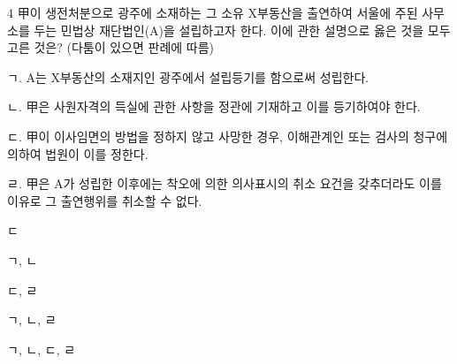 \begin{question}{4}
甲이 생전처분으로 광주에 소재하는 그 소유 X부동산을 출연하여 서울에 주된 사무소를 두는 민법상 재단법인(A)을 설립하고자 한다. 이에 관한 설명으로 옳은 것을 모두 고른 것은? (다툼이 있으면 판례에 따름)
\begin{framedtext}
ㄱ. A는 X부동산의 소재지인 광주에서 설립등기를 함으로써 성립한다. \par
ㄴ. 甲은 사원자격의 득실에 관한 사항을 정관에 기재하고 이를 등기하여야 한다. \par
ㄷ. 甲이 이사임면의 방법을 정하지 않고 사망한 경우, 이해관계인 또는 검사의 청구에 의하여 법원이 이를 정한다. \par
ㄹ. 甲은 A가 성립한 이후에는 착오에 의한 의사표시의 취소 요건을 갖추더라도 이를 이유로 그 출연행위를 취소할 수 없다. \par
\end{framedtext}
\begin{choices}
  \item ㄷ
  \item ㄱ, ㄴ
  \item ㄷ, ㄹ
  \item ㄱ, ㄴ, ㄹ
  \item ㄱ, ㄴ, ㄷ, ㄹ
\end{choices}
\end{question}
